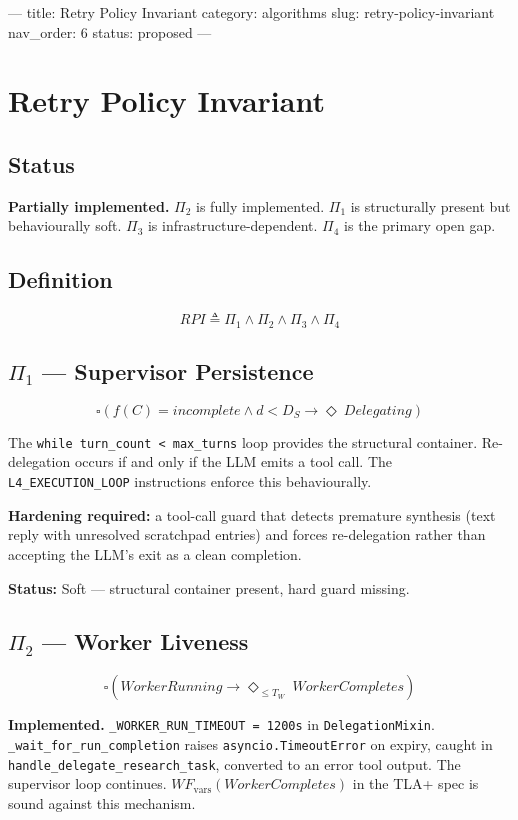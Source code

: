 ---
title: Retry Policy Invariant
category: algorithms
slug: retry-policy-invariant
nav_order: 6
status: proposed
---

\section{Retry Policy Invariant}

\subsection*{Status}

\textbf{Partially implemented.} $\Pi_2$ is fully implemented. $\Pi_1$ is
structurally present but behaviourally soft. $\Pi_3$ is infrastructure-dependent.
$\Pi_4$ is the primary open gap.

\subsection*{Definition}

\[ RPI \triangleq \Pi_1 \wedge \Pi_2 \wedge \Pi_3 \wedge \Pi_4 \]

\subsection*{$\Pi_1$ — Supervisor Persistence}

\[ \square \left( f(C) = incomplete \wedge d < D_S \rightarrow \Diamond\ Delegating \right) \]

The \texttt{while turn\_count < max\_turns} loop provides the structural container.
Re-delegation occurs if and only if the LLM emits a tool call.
The \texttt{L4\_EXECUTION\_LOOP} instructions enforce this behaviourally.

\textbf{Hardening required:} a tool-call guard that detects premature synthesis
(text reply with unresolved scratchpad entries) and forces re-delegation rather
than accepting the LLM's exit as a clean completion.

\textbf{Status:} Soft — structural container present, hard guard missing.

\subsection*{$\Pi_2$ — Worker Liveness}

\[ \square \left( WorkerRunning \rightarrow \Diamond_{\leq T_W}\ WorkerCompletes \right) \]

\textbf{Implemented.} \texttt{\_WORKER\_RUN\_TIMEOUT = 1200s} in \texttt{DelegationMixin}.
\texttt{\_wait\_for\_run\_completion} raises \texttt{asyncio.TimeoutError} on expiry,
caught in \texttt{handle\_delegate\_research\_task}, converted to an error tool output.
The supervisor loop continues. $WF_{\text{vars}}(WorkerCompletes)$ in the TLA+ spec
is sound against this mechanism.

